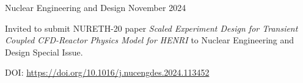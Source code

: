 

    \cventry
    {} %
    {Nuclear Engineering and Design} %
    {} %
    {November 2024} %
    {
    \begin{cvitems}
        \item{Invited to submit NURETH-20 paper \textit{Scaled Experiment Design for Transient Coupled CFD-Reactor Physics Model for HENRI} to Nuclear Engineering and Design Special Issue.}
        \item{DOI: \href{https://doi.org/10.1016/j.nucengdes.2024.113452}{https://doi.org/10.1016/j.nucengdes.2024.113452}} 
    \end{cvitems}
    }



